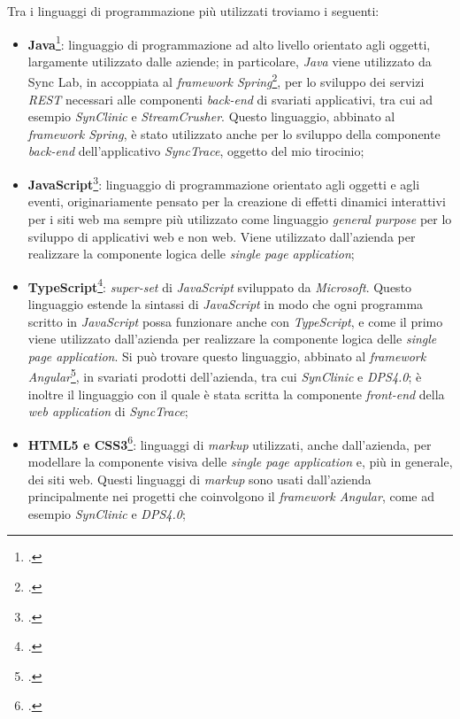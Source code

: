 Tra i linguaggi di programmazione più utilizzati troviamo i seguenti:
\begin{itemize}
  \item \textbf{Java}\footcite{tec:java}: linguaggio di programmazione ad alto livello orientato agli oggetti, largamente utilizzato dalle aziende; in particolare, \textit{Java} viene utilizzato da Sync Lab, in accoppiata al \textit{framework Spring}\footcite{tec:spring}, per lo sviluppo dei servizi \textit{REST} necessari alle componenti \textit{back-end} di svariati applicativi, tra cui ad esempio \textit{SynClinic} e \textit{StreamCrusher}. Questo linguaggio, abbinato al \textit{framework Spring}, è stato utilizzato anche per lo sviluppo della componente \textit{back-end} dell'applicativo \textit{SyncTrace}, oggetto del mio tirocinio;

  \item \textbf{JavaScript}\footcite{tec:javascript}: linguaggio di programmazione orientato agli oggetti e agli eventi, originariamente pensato per la creazione di effetti dinamici interattivi per i siti web ma sempre più utilizzato come linguaggio \textit{general purpose} per lo sviluppo di applicativi web e non web. Viene utilizzato dall'azienda per realizzare la componente logica delle \textit{single page application};

  \item \textbf{TypeScript}\footcite{tec:typescript}: \textit{super-set} di \textit{JavaScript} sviluppato da \textit{Microsoft}. Questo linguaggio estende la sintassi di \textit{JavaScript} in modo che ogni programma scritto in \textit{JavaScript} possa funzionare anche con \textit{TypeScript}, e come il primo viene utilizzato dall'azienda per realizzare la componente logica delle \textit{single page application}. Si può trovare questo linguaggio, abbinato al \textit{framework Angular}\footcite{tec:angular}, in svariati prodotti dell'azienda, tra cui \textit{SynClinic} e \textit{DPS4.0}; è inoltre il linguaggio con il quale è stata scritta la componente \textit{front-end} della \textit{web application} di \textit{SyncTrace};

  \item \textbf{HTML5 e CSS3}\footcite{tec:htmlcss}: linguaggi di \textit{markup} utilizzati, anche dall'azienda, per modellare la componente visiva delle \textit{single page application} e, più in generale, dei siti web. Questi linguaggi di \textit{markup} sono usati dall'azienda principalmente nei progetti che coinvolgono il \textit{framework Angular}, come ad esempio \textit{SynClinic} e \textit{DPS4.0};


\end{itemize}
